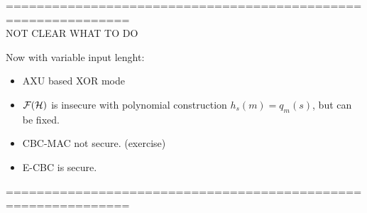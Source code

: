 ==============================================================\\
NOT CLEAR WHAT TO DO 
\begin{exercise}
    Now with variable input lenght:
    \begin{itemize}
        \item AXU based XOR mode 
        \item $\mathcal{F}(\mathcal{H})$ is insecure with polynomial construction
            $h_{s}(m)=q_{m}(s)$, but can be fixed.
        \item CBC-MAC not secure. (exercise)
        \item E-CBC is secure.
    \end{itemize}
==============================================================\\
    
\end{exercise}
\newpage
